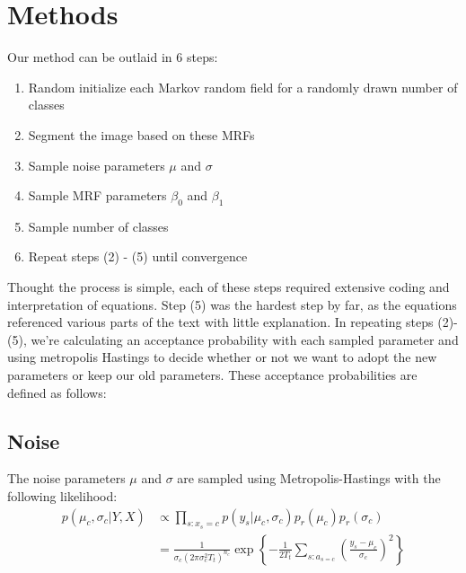 \documentclass[11pt]{article}
\begin{document}
\section{Methods}
Our method can be outlaid in 6 steps:

\begin{enumerate}
	\item Random initialize each Markov random field for a randomly drawn number of classes
	\item Segment the image based on these MRFs
	\item Sample noise parameters $\mu$ and $\sigma$
	\item Sample MRF parameters $\beta_0$ and $\beta_1$
	\item Sample number of classes
	\item Repeat steps (2) - (5) until convergence
\end{enumerate}
Thought the process is simple, each of these steps required extensive coding and interpretation of equations. Step (5) was the hardest step by far, as the equations referenced various parts of the text with little explanation. In repeating steps (2)-(5), we’re calculating an acceptance probability with each sampled parameter and using metropolis Hastings to decide whether or not we want to adopt the new parameters or keep our old parameters. These acceptance probabilities are defined as follows:

\subsection{Noise}
The noise parameters $\mu$ and $\sigma$ are sampled using Metropolis-Hastings with the following likelihood:
\begin{equation}
\begin{aligned}
p\left(\mu_{c}, \sigma_{c} | Y, X\right) & \propto \prod_{s: x_{s}=c} p\left(y_{s} | \mu_{c}, \sigma_{c}\right) p_{r}\left(\mu_{c}\right) p_{r}\left(\sigma_{c}\right) \\
&=\frac{1}{\sigma_{c}\left(2 \pi \sigma_{c}^{2} T_{t}\right)^{n_{c}}} \exp \left\{-\frac{1}{2 T_{t}} \sum_{s: a_{s=c}}\left(\frac{y_{s}-\mu_{c}}{\sigma_{c}}\right)^{2}\right\}
\end{aligned}
\end{equation}
\end{document}
